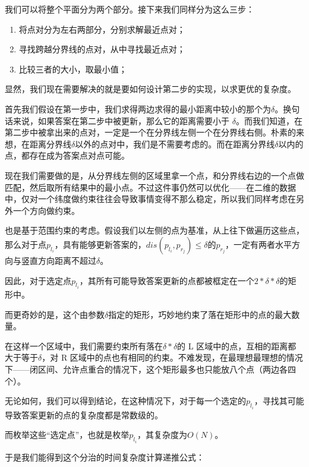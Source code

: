 \documentclass{article}
\begin{document}
\hspace*{\fill}\par

我们可以将整个平面分为两个部分。接下来我们同样分为这么三步：
\begin{enumerate}
    \item 将点对分为左右两部分，分别求解最近点对；
    \item 寻找跨越分界线的点对，从中寻找最近点对；
    \item 比较三者的大小，取最小值；
\end{enumerate}\par
显然，我们现在需要解决的就是要如何设计第二步的实现，以求更优的复杂度。\par
首先我们假设在第一步中，我们求得两边求得的最小距离中较小的那个为$\delta$。换句话来说，如果答案在第二步中被更新，那么它的距离需要小于 $\delta$。而我们知道，在第二步中被拿出来的点对，一定是一个在分界线左侧一个在分界线右侧。朴素的来想，在距离分界线$\delta$以外的点对中，我们是不需要考虑的。而在距离分界线$\delta$以内的点，都存在成为答案点对点可能。\par
现在我们需要做的是，从分界线左侧的区域里拿一个点，和分界线右边的一个点做匹配，然后取所有结果中的最小点。不过这件事仍然可以优化——在二维的数据中，仅对一个纬度做约束往往会导致事情变得不那么稳定，所以我们同样考虑在另外一个方向做约束。\par
也是基于范围约束的考虑。假设我们以左侧的点为基准，从上往下做遍历这些点，那么对于点$p_{l_i}$，具有能够更新答案的，$dis(p_{l_i},p_{r_j}) \leq \delta$的$p_{r_j}$，一定有两者水平方向与竖直方向距离不超过$\delta$。\par
因此，对于选定点$p_{l_i}$，其所有可能导致答案更新的点都被框定在一个$2*\delta * \delta$的矩形中。\par
而更奇妙的是，这个由参数$\delta$指定的矩形，巧妙地约束了落在矩形中的点的最大数量。\par
在这样一个区域中，我们需要约束所有落在$\delta * \delta$的 L 区域中的点，互相的距离都大于等于$\delta$，对 R 区域中的点也有相同的约束。不难发现，在最理想最理想的情况下——闭区间、允许点重合的情况下，这个矩形最多也只能放八个点（两边各四个）。\par
无论如何，我们可以得到结论，在这种情况下，对于每一个选定的$p_{l_i}$，寻找其可能导致答案更新的点的复杂度都是常数级的。\par
而枚举这些“选定点”，也就是枚举$p_{l_i}$，其复杂度为$O(N)$。\par
于是我们能得到这个分治的时间复杂度计算递推公式：\par
\end{document}
